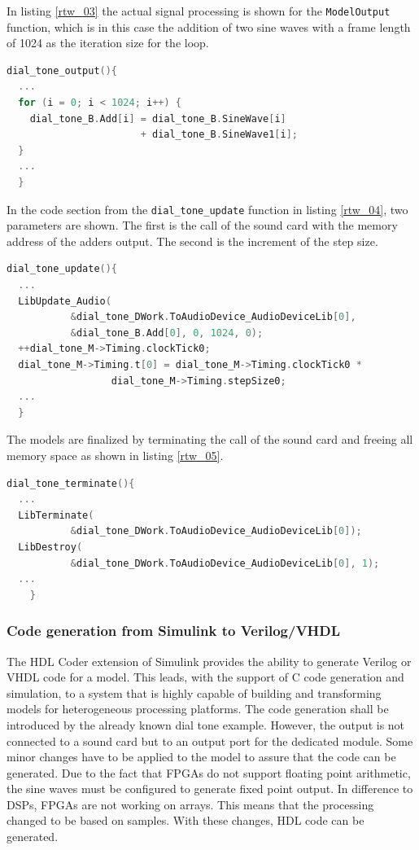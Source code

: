 In listing \ref{rtw_03} the actual signal processing is shown for the \texttt{ModelOutput} function, which is in this case the addition of two sine waves with a frame length of 1024 as the iteration size for the loop.
  
\begin{lstlisting}[language=C,columns=flexible,caption= Signal processing in the dial tone,label=rtw_03]
dial_tone_output(){
  ...
  for (i = 0; i < 1024; i++) {
    dial_tone_B.Add[i] = dial_tone_B.SineWave[i]
                       + dial_tone_B.SineWave1[i];
  }
  ...
  }
\end{lstlisting}

In the code section from the \texttt{dial\_tone\_update} function in listing \ref{rtw_04}, two parameters are shown. The first is the call of the sound card with the memory address of the adders output. The second is the increment of the step size. 

\begin{lstlisting}[language=C,columns=flexible,caption= Update of the model's states,label=rtw_04]
dial_tone_update(){
  ...
  LibUpdate_Audio(
           &dial_tone_DWork.ToAudioDevice_AudioDeviceLib[0],
           &dial_tone_B.Add[0], 0, 1024, 0);
  ++dial_tone_M->Timing.clockTick0;
  dial_tone_M->Timing.t[0] = dial_tone_M->Timing.clockTick0 *
                  dial_tone_M->Timing.stepSize0;
  ...
  }
\end{lstlisting}

The models are finalized by terminating the call of the sound card and freeing all memory space as shown in listing \ref{rtw_05}.

\begin{lstlisting}[language=C,columns=flexible,caption= Termination of the model,label=rtw_05]
dial_tone_terminate(){
  ...
  LibTerminate(
           &dial_tone_DWork.ToAudioDevice_AudioDeviceLib[0]);
  LibDestroy(
           &dial_tone_DWork.ToAudioDevice_AudioDeviceLib[0], 1);
  ...
	}
\end{lstlisting}

\subsubsection{Code generation from Simulink to Verilog/VHDL}
The HDL Coder extension of Simulink \cite{hdl_ug} provides the ability to generate Verilog or VHDL code for a model. This leads, with the support of C code generation and simulation, to a system that is highly capable of building and transforming models for heterogeneous processing platforms. The code generation shall be introduced by the already known dial tone example. However, the output is not connected to a sound card but to an output port for the dedicated module. Some minor changes have to be applied to the model to assure that the code can be generated. Due to the fact that FPGAs do not support floating point arithmetic, the sine waves must be configured to generate fixed point output. In difference to DSPs, FPGAs are not working on arrays. This means that the processing changed to be based on samples. With these changes, HDL code can be generated.

